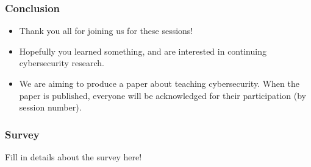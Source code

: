 \documentclass[red]{beamer}
\begin{document}

\begin{frame}\frametitle{Conclusion}
\begin{itemize}
\item Thank you all for joining us for these sessions!
\item Hopefully you learned something, and are interested in continuing cybersecurity research.
\item We are aiming to produce a paper about teaching cybersecurity.
When the paper is published, everyone will be acknowledged for their participation (by session number).
\end{itemize}
\end{frame}

\begin{frame}\frametitle{Survey}
Fill in details about the survey here!
\end{frame}
\end{document}

